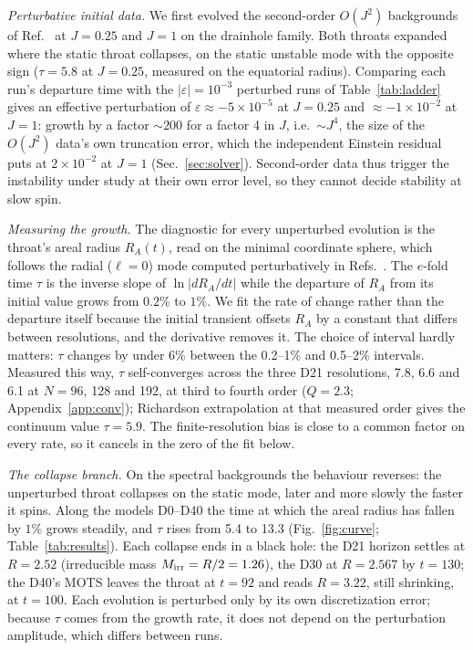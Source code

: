 \documentclass[twocolumn,floatfix,aps,prd,superscriptaddress,nofootinbib]{revtex4-2}
\begin{document}
\emph{Perturbative initial data.} We first evolved the second-order $O(J^2)$ backgrounds of Ref.~\cite{azad2024} at $J=0.25$ and $J=1$ on the drainhole family. Both throats expanded where the static throat collapses, on the static unstable mode with the opposite sign ($\tau=5.8$ at $J=0.25$, measured on the equatorial radius). Comparing each run's departure time with the $|\varepsilon|=10^{-3}$ perturbed runs of Table~\ref{tab:ladder} gives an effective perturbation of $\varepsilon\approx-5\times10^{-5}$ at $J=0.25$ and ${\approx}-1\times10^{-2}$ at $J=1$: growth by a factor ${\sim}200$ for a factor 4 in $J$, i.e.\ ${\sim}J^4$, the size of the $O(J^2)$ data's own truncation error, which the independent Einstein residual puts at $2\times10^{-2}$ at $J=1$ (Sec.~\ref{sec:solver}). Second-order data thus trigger the instability under study at their own error level, so they cannot decide stability at slow spin.

\emph{Measuring the growth.} The diagnostic for every unperturbed evolution is the throat's areal radius $R_A(t)$, read on the minimal coordinate sphere, which follows the radial ($\ell=0$) mode computed perturbatively in Refs.~\cite{azad2023,azad2024}. The $e$-fold time $\tau$ is the inverse slope of $\ln|dR_A/dt|$ while the departure of $R_A$ from its initial value grows from $0.2\%$ to $1\%$. We fit the rate of change rather than the departure itself because the initial transient offsets $R_A$ by a constant that differs between resolutions, and the derivative removes it. The choice of interval hardly matters: $\tau$ changes by under $6\%$ between the 0.2--1\% and 0.5--2\% intervals. Measured this way, $\tau$ self-converges across the three D21 resolutions, 7.8, 6.6 and 6.1 at $N=96$, 128 and 192, at third to fourth order ($Q=2.3$; Appendix~\ref{app:conv}); Richardson extrapolation at that measured order gives the continuum value $\tau=5.9$. The finite-resolution bias is close to a common factor on every rate, so it cancels in the zero of the fit below.

\emph{The collapse branch.} On the spectral backgrounds the behaviour reverses: the unperturbed throat collapses on the static mode, later and more slowly the faster it spins. Along the models D0--D40 the time at which the areal radius has fallen by $1\%$ grows steadily, and $\tau$ rises from 5.4 to 13.3 (Fig.~\ref{fig:curve}; Table~\ref{tab:results}). Each collapse ends in a black hole: the D21 horizon settles at $R=2.52$ (irreducible mass $M_{\rm irr}=R/2=1.26$), the D30 at $R=2.567$ by $t=130$; the D40's MOTS leaves the throat at $t=92$ and reads $R=3.22$, still shrinking, at $t=100$. Each evolution is perturbed only by its own discretization error; because $\tau$ comes from the growth rate, it does not depend on the perturbation amplitude, which differs between runs.
\end{document}
